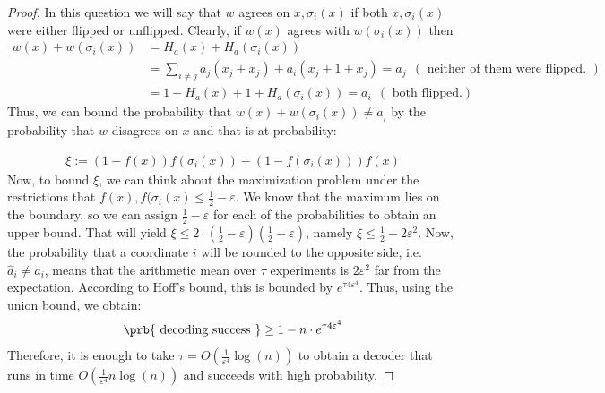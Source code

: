 \documentclass{article}
\begin{document}
\begin{proof}
  In this question we will say that $w$ agrees on $x,\sigma_{i}(x)$ if both $x,\sigma_{i}(x)$ were either flipped or unflipped. Clearly, if $w(x)$ agrees with $w(\sigma_{i}(x))$ then  
  \begin{equation*}
    \begin{split}
      w\left( x \right) + w\left( \sigma_{i}(x) \right) & = H_{a}(x) + H_{a}(\sigma_{i}(x)) \\
      & = \sum_{i\neq j }{a_{j}(x_{j} + x_{j})} + a_{i}(x_{j} + 1 + x_{j})  = a_{j} \ \ ( \text{   neither of them were flipped. } ) \\
      & = 1 + H_{a}(x) + 1 + H_{a}(\sigma_{i}(x)) =  a_{i} \ \ (  \text{   both flipped.} )
    \end{split}
  \end{equation*}
  Thus, we can bound the probability that $ w\left( x \right) + w\left( \sigma_{i}(x) \right) \neq a_{_i}$ by the probability that $w$ disagrees on $x$ and that is at probability: 
  
  \begin{equation*}
    \begin{split}
     \xi := \left(1 - f(x)\right)f(\sigma_{i}(x)) + \left(1 - f(\sigma_{i}(x))\right)f(x)
    \end{split}
  \end{equation*}
  Now, to bound $\xi$, we can think about the maximization problem under the restrictions that $f(x),f(\sigma_{i}(x) \le \frac{1}{2} - \varepsilon$. We know that the maximum lies on the boundary, so we can assign $\frac{1}{2} - \varepsilon$ for each of the probabilities to obtain an upper bound. That will yield $\xi \le 2\cdot \left( \frac{1}{2} - \varepsilon \right)\left( \frac{1}{2} + \varepsilon \right)$, namely $\xi \le \frac{1}{2}- 2\varepsilon^{2}$. 
    Now, the probability that a coordinate $i$ will be rounded to the opposite side, i.e. $\hat{a}_{i} \neq a_{i}$, means that the arithmetic mean over $\tau$ experiments is $2\varepsilon^{2}$ far from the expectation. According to Hoff's bound, this is bounded by $e^{\tau 4\varepsilon^{4}}$. Thus, using the union bound, we obtain:     
    \begin{equation*}
      \begin{split}
        \prb{\text{ decoding success }} \ge 1 - n \cdot e^{\tau 4\varepsilon^{4}}
      \end{split}
    \end{equation*} 
    Therefore, it is enough to take $\tau = O( \frac{1}{\varepsilon^{4}} \log(n)  )$ to obtain a decoder that runs in time $O(  \frac{1}{\varepsilon^{4}} n \log(n))$ and succeeds with high probability.   
\end{proof}
\end{document}
